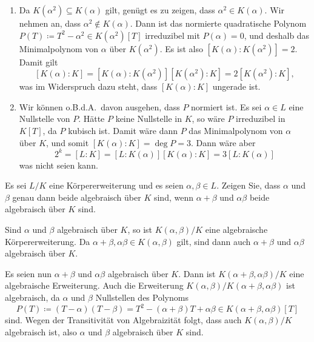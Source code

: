 \begin{solution}
  \begin{enumerate}
    \item
      Da $K(\alpha^2) \subseteq K(\alpha)$ gilt, genügt es zu zeigen, dass $\alpha^2 \in K(\alpha)$.
      Wir nehmen an, dass $\alpha^2 \notin K(\alpha)$.
      Dann ist das normierte quadratische Polynom $P(T) \coloneqq T^2 - \alpha^2 \in K(\alpha^2)[T]$ irreduzibel mit $P(\alpha) = 0$, und deshalb das Minimalpolynom von $\alpha$ über $K(\alpha^2)$.
      Es ist also $[K(\alpha) : K(\alpha^2)] = 2$.
      Damit gilt
      \[
          [K(\alpha) : K]
        = [K(\alpha) : K(\alpha^2)] [K(\alpha^2) : K]
        = 2 [K(\alpha^2) : K],
      \]
      was im Widerspruch dazu steht, dass $[K(\alpha) : K]$ ungerade ist.
      
    \item
      Wir können o.B.d.A.\ davon ausgehen, dass $P$ normiert ist.
      Es sei $\alpha \in L$ eine Nullstelle von $P$.
      Hätte $P$ keine Nullstelle in $K$, so wäre $P$ irreduzibel in $K[T]$, da $P$ kubisch ist.
      Damit wäre dann $P$ das Minimalpolynom von $\alpha$ über $K$, und somit $[K(\alpha) : K] = \deg P = 3$.
      Dann wäre aber
      \[
              2^k
        =     [L : K]
        =     [L : K(\alpha)] [K(\alpha) : K]
        =     3[L : K(\alpha)]
      \]
      was nicht seien kann.
  \end{enumerate}
\end{solution}


\begin{question}[subtitle = Algebraizität von Summe und Produkt]
  Es sei $L/K$ eine Körpererweiterung und es seien $\alpha, \beta \in L$.
  Zeigen Sie, dass $\alpha$ und $\beta$ genau dann beide algebraisch über $K$ sind, wenn $\alpha + \beta$ und $\alpha \beta$ beide algebraisch über $K$ sind.
\end{question}


\begin{solution}
  Sind $\alpha$ und $\beta$ algebraisch über $K$, so ist $K(\alpha, \beta) / K$ eine algebraische Körpererweiterung.
  Da $\alpha + \beta, \alpha \beta \in K(\alpha, \beta)$ gilt, sind dann auch $\alpha + \beta$ und $\alpha \beta$ algebraisch über $K$.
  
  Es seien nun $\alpha + \beta$ und $\alpha \beta$ algebraisch über $K$.
  Dann ist $K(\alpha + \beta, \alpha \beta)/K$ eine algebraische Erweiterung.
  Auch die Erweiterung $K(\alpha, \beta)/K(\alpha + \beta, \alpha \beta)$ ist algebraisch, da $\alpha$ und $\beta$ Nullstellen des Polynoms
  \[
              P(T)
    \coloneqq (T - \alpha)(T - \beta)
    =         T^2 - (\alpha + \beta)T + \alpha \beta
    \in       K(\alpha + \beta, \alpha \beta)[T]
  \]
  sind.
  Wegen der Transitivität von Algebraizität folgt, dass auch $K(\alpha,\beta)/K$ algebraisch ist, also $\alpha$ und $\beta$ algebraisch über $K$ sind.
\end{solution}


